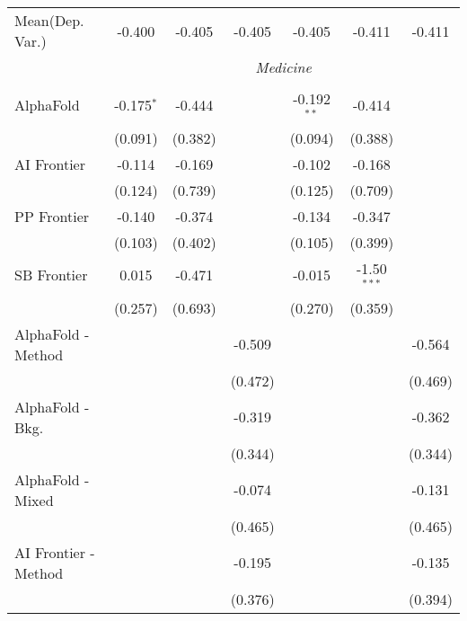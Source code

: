\begin{tabular}{lcccccc}
Mean(Dep. Var.) & -0.400 & -0.405 & -0.405 & -0.405 & -0.411 & -0.411 \\
 & \multicolumn{6}{c}{\textit{Medicine}} \\ \\
   AlphaFold            & -0.175$^{*}$ & -0.444  &               & -0.192$^{**}$ & -0.414        &   \\   
                        & (0.091)      & (0.382) &               & (0.094)       & (0.388)       &   \\   
   AI Frontier          & -0.114       & -0.169  &               & -0.102        & -0.168        &   \\   
                        & (0.124)      & (0.739) &               & (0.125)       & (0.709)       &   \\   
   PP Frontier          & -0.140       & -0.374  &               & -0.134        & -0.347        &   \\   
                        & (0.103)      & (0.402) &               & (0.105)       & (0.399)       &   \\   
   SB Frontier          & 0.015        & -0.471  &               & -0.015        & -1.50$^{***}$ &   \\   
                        & (0.257)      & (0.693) &               & (0.270)       & (0.359)       &   \\   
   AlphaFold - Method   &              &         & -0.509        &               &               & -0.564\\   
                        &              &         & (0.472)       &               &               & (0.469)\\   
   AlphaFold - Bkg.     &              &         & -0.319        &               &               & -0.362\\   
                        &              &         & (0.344)       &               &               & (0.344)\\   
   AlphaFold - Mixed    &              &         & -0.074        &               &               & -0.131\\   
                        &              &         & (0.465)       &               &               & (0.465)\\   
   AI Frontier - Method &              &         & -0.195        &               &               & -0.135\\   
                        &              &         & (0.376)       &               &               & (0.394)\\   

\end{tabular}
